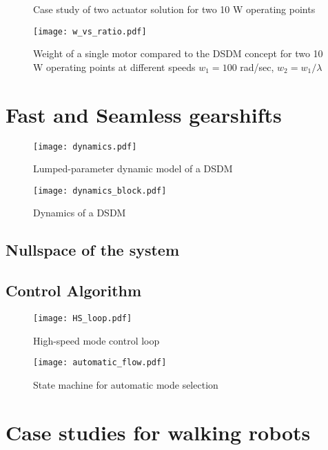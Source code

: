 \begin{figure}[H]
        \centering
        \caption{Case study of two actuator solution for two 10 W operating points }\label{fig:solutions}
\end{figure}

\begin{figure}[H]
	\centering
		\texttt{[image: w\_vs\_ratio.pdf]}
	\caption{Weight of a single motor compared to the DSDM concept for two 10 W operating points at different speeds $w_1=100$ rad/sec, $w_2 = w_1 / \lambda$}
	\label{fig:1vs2}
\end{figure}


\section{Fast and Seamless gearshifts}
\label{sec:FastAndSeamlessGearshifts}

\begin{figure}[H]
	\centering
		\texttt{[image: dynamics.pdf]}
	\caption{Lumped-parameter dynamic model of a DSDM}
	\label{fig:dynamics}
\end{figure}

\begin{figure}[H]
	\centering
		\texttt{[image: dynamics\_block.pdf]}
	\caption{Dynamics of a DSDM}
	\label{fig:dynamics_block}
\end{figure}

\subsection{Nullspace of the system}

\subsection{Control Algorithm}


\begin{figure}[H]
	\centering
		\texttt{[image: HS\_loop.pdf]}
	\caption{High-speed mode control loop}
	\label{fig:HS_loop}
\end{figure}

\begin{figure}[H]
	\centering
		\texttt{[image: automatic\_flow.pdf]}
	\caption{State machine for automatic mode selection}
	\label{fig:automaticflow}
\end{figure}

\section{Case studies for walking robots}
\label{sec:walking}




